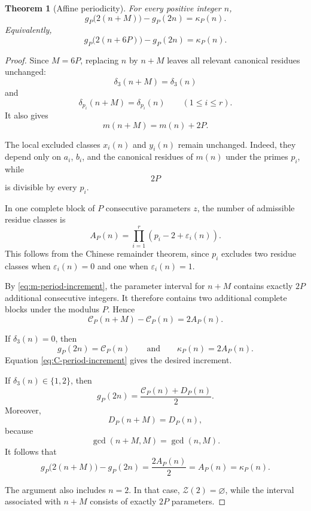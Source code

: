 \documentclass[12pt]{article}
\numberwithin{equation}{section}
\newtheorem{theorem}{Theorem}[section]
\theoremstyle{definition}
\theoremstyle{remark}
\newcommand{\Ccal}{\mathcal C}
\newcommand{\Zcal}{\mathcal Z}
\begin{document}
\begin{theorem}[Affine periodicity]
\label{thm:affine-periodicity}
For every positive integer $n$,
\begin{equation}
\label{eq:affine-periodicity}
g_P\bigl(2(n+M)\bigr)-g_P(2n)
=
\kappa_P(n).
\end{equation}
Equivalently,
\[
g_P\bigl(2(n+6P)\bigr)-g_P(2n)
=
\kappa_P(n).
\]
\end{theorem}

\begin{proof}
Since $M=6P$, replacing $n$ by $n+M$ leaves all relevant
canonical residues unchanged:
\[
\delta_3(n+M)=\delta_3(n)
\]
and
\[
\delta_{p_i}(n+M)=\delta_{p_i}(n)
\qquad
(1\leq i\leq r).
\]
It also gives
\begin{equation}
\label{eq:m-period-increment}
m(n+M)=m(n)+2P.
\end{equation}

The local excluded classes $x_i(n)$ and $y_i(n)$ remain
unchanged. Indeed, they depend only on $a_i$, $b_i$, and the
canonical residues of $m(n)$ under the primes $p_i$, while
\[
2P
\]
is divisible by every $p_i$.

In one complete block of $P$ consecutive parameters $z$, the
number of admissible residue classes is
\[
A_P(n)
=
\prod_{i=1}^{r}
\left(p_i-2+\varepsilon_i(n)\right).
\]
This follows from the Chinese remainder theorem, since $p_i$
excludes two residue classes when $\varepsilon_i(n)=0$ and one
when $\varepsilon_i(n)=1$.

By \eqref{eq:m-period-increment}, the parameter interval for
$n+M$ contains exactly $2P$ additional consecutive integers.
It therefore contains two additional complete blocks under the
modulus $P$. Hence
\begin{equation}
\label{eq:C-period-increment}
\Ccal_P(n+M)-\Ccal_P(n)
=
2A_P(n).
\end{equation}

If $\delta_3(n)=0$, then
\[
g_P(2n)=\Ccal_P(n)
\qquad\text{and}\qquad
\kappa_P(n)=2A_P(n).
\]
Equation \eqref{eq:C-period-increment} gives the desired
increment.

If $\delta_3(n)\in\{1,2\}$, then
\[
g_P(2n)
=
\frac{\Ccal_P(n)+D_P(n)}{2}.
\]
Moreover,
\[
D_P(n+M)=D_P(n),
\]
because
\[
\gcd(n+M,M)=\gcd(n,M).
\]
It follows that
\[
g_P\bigl(2(n+M)\bigr)-g_P(2n)
=
\frac{2A_P(n)}{2}
=
A_P(n)
=
\kappa_P(n).
\]

The argument also includes $n=2$. In that case,
$\Zcal(2)=\varnothing$, while the interval associated with
$n+M$ consists of exactly $2P$ parameters.
\end{proof}
\end{document}
